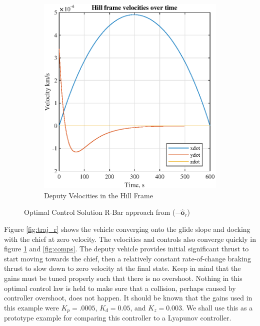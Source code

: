 \documentclass[conf]{new-aiaa}
\begin{document}
\begin{singlespace}
\begin{figure}[htpb!]
\begin{subfigure}{.5\textwidth}
  \includegraphics[width=.8\linewidth]{figures/hillvels_R.eps}
  \caption{Deputy Velocities in the Hill Frame}
  \label{fig:vels_r}
\end{subfigure}
\caption{Optimal Control Solution   R-Bar approach from ($-\bm{\hat{o}}_r$)}
\label{fig:v1}
\end{figure}

Figure \ref{fig:traj_r} shows the vehicle converging onto the glide slope and docking with the chief at zero velocity. The velocities and controls also converge quickly in figure \ref{fig:vels_r} and \ref{fig:comps}. The deputy vehicle provides initial significant thrust to start moving towards the chief, then a relatively constant rate-of-change braking thrust to slow down to zero velocity at the final state. Keep in mind that the gains must be tuned properly such that there is no overshoot. Nothing in this optimal control law is held to make sure that a collision, perhaps caused by controller overshoot, does not happen. It should be known that the gains used in this example were $K_p = .0005$, $K_d =0.05$, and $K_z = 0.003$. 
We shall use this as a prototype example for comparing this controller to a Lyapunov controller. 



\clearpage

\end{singlespace}
\end{document}
